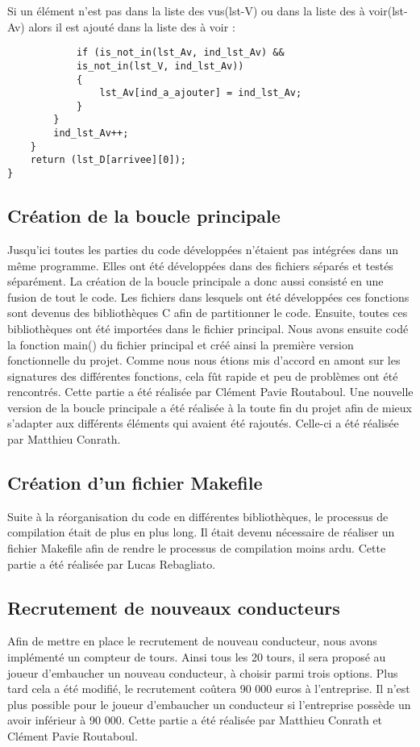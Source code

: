 \documentclass[a4paper, 12pt]{article}
\begin{document}
     Si un élément n'est pas dans la liste des vus(lst-V) ou dans la liste des à voir(lst-Av) alors il est ajouté dans la liste des à voir : \begin{lstlisting}
            if (is_not_in(lst_Av, ind_lst_Av) && 
            is_not_in(lst_V, ind_lst_Av)) 
            {
                lst_Av[ind_a_ajouter] = ind_lst_Av;
            }
        }
        ind_lst_Av++;
    }
    return (lst_D[arrivee][0]);
} 
  \end{lstlisting}      
\newpage
            
    \subsection{Création de la boucle principale}
        Jusqu'ici toutes les parties du code développées n'étaient pas intégrées dans un même programme. Elles ont été développées dans des fichiers séparés et testés séparément. La création de la boucle principale a donc aussi consisté en une fusion de tout le code. Les fichiers dans lesquels ont été développées ces fonctions sont devenus des bibliothèques C afin de partitionner le code. Ensuite, toutes ces bibliothèques ont été importées dans le fichier principal.
        \newline
        Nous avons ensuite codé la fonction main() du fichier principal et créé ainsi la première version fonctionnelle du projet. Comme nous nous étions mis d'accord en amont sur les signatures des différentes fonctions, cela fût rapide et peu de problèmes ont été rencontrés. Cette partie a été réalisée par Clément Pavie Routaboul.
        Une nouvelle version de la boucle principale a été réalisée à la toute fin du projet afin de mieux s'adapter aux différents éléments qui avaient été rajoutés. Celle-ci a été réalisée par Matthieu Conrath.
    \subsection{Création d'un fichier Makefile}
        Suite à la réorganisation du code en différentes bibliothèques, le processus de compilation était de plus en plus long. Il était devenu nécessaire de réaliser un fichier Makefile afin de rendre le processus de compilation moins ardu.
        Cette partie a été réalisée par Lucas Rebagliato.
    \subsection{Recrutement de nouveaux conducteurs}
        Afin de mettre en place le recrutement de nouveau conducteur, nous avons implémenté un compteur de tours. Ainsi tous les 20 tours, il sera proposé au joueur d'embaucher un nouveau conducteur, à choisir parmi trois options. Plus tard cela a été modifié, le recrutement coûtera 90 000 euros à l'entreprise. Il n'est plus possible pour le joueur d'embaucher un conducteur si l'entreprise possède un avoir inférieur à 90 000.
        Cette partie a été réalisée par Matthieu Conrath et Clément Pavie Routaboul.
\end{document}

